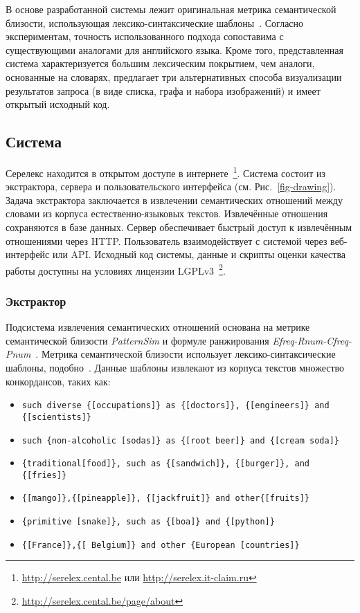 \documentclass[a4paper,10pt,twoside]{article}
\begin{document}
В основе разработанной системы лежит оригинальная метрика семантической близости, использующая лексико-синтаксические шаблоны~\cite{panchenko2012konvens}. Согласно экспериментам, точность использованного подхода сопоставима с существующими аналогами для английского языка. Кроме того, представленная система характеризуется большим лексическим покрытием, чем аналоги, основанные на словарях, предлагает три альтернативных способа визуализации результатов запроса (в виде списка, графа и набора изображений) и имеет открытый исходный код.

\subsection{Система}

Серелекс находится в открытом доступе в интернете~\footnote{\url{http://serelex.cental.be} или \url{http://serelex.it-claim.ru} }.
Система состоит из экстрактора, сервера и пользовательского интерфейса (см. Рис.~\ref{fig-drawing}). Задача экстрактора заключается в извлечении семантических отношений между словами из корпуса естественно-языковых текстов. Извлечённые отношения сохраняются в базе данных. Сервер обеспечивает быстрый доступ к извлечённым отношениями через HTTP. Пользователь взаимодействует с системой через веб-интерфейс или API. Исходный код системы, данные и скрипты оценки качества работы доступны на условиях лицензии LGPLv3~\footnote{ \url{http://serelex.cental.be/page/about} }.


\subsubsection{Экстрактор} Подсистема извлечения семантических отношений основана на метрике семантической близости \textit{PatternSim} и формуле ранжирования \textit{Efreq-Rnum-Cfreq-Pnum}~\cite{panchenko2012konvens}. Метрика семантической близости использует лексико-синтаксические шаблоны, подобно~\cite{hearst1992}. Данные шаблоны извлекают из корпуса текстов множество конкордансов, таких как: 

\begin{itemize}
\footnotesize
\item \texttt{such diverse \{[occupations]\} as \{[doctors]\}, \{[engineers]\} and \{[scientists]\}}

\item \texttt{such \{non-alcoholic [sodas]\} as \{[root beer]\} and \{[cream 
 soda]\}}
 
\item \texttt{\{traditional[food]\}, such as \{[sandwich]\}, \{[burger]\}, and \{[fries]\}}

\item \texttt{\{[mango]\},\{[pineapple]\}, \{[jackfruit]\} and other\{[fruits]\}}

\item \texttt{\{primitive [snake]\}, such as \{[boa]\} and \{[python]\}}
\item \texttt{\{[France]\},\{[ Belgium]\} and other \{European [countries]\}}
\end{itemize}
\end{document}
